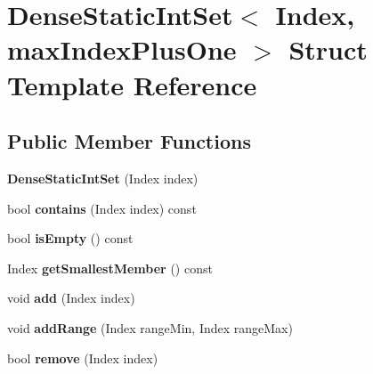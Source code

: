 \hypertarget{struct_dense_static_int_set}{}\section{Dense\+Static\+Int\+Set$<$ Index, max\+Index\+Plus\+One $>$ Struct Template Reference}
\label{struct_dense_static_int_set}
\subsection*{Public Member Functions}
\begin{DoxyCompactItemize}
\item 
\mbox{\label{struct_dense_static_int_set_a066decca43c123618bacd47fc1da8c12}} 
{\bfseries Dense\+Static\+Int\+Set} (Index index)
\item 
\mbox{\label{struct_dense_static_int_set_a20fadddd5d316b82a7c04a50fb3619fc}} 
bool {\bfseries contains} (Index index) const
\item 
\mbox{\label{struct_dense_static_int_set_add9d4f93d3d27d4f662b388e1c797cb2}} 
bool {\bfseries is\+Empty} () const
\item 
\mbox{\label{struct_dense_static_int_set_a9540b1765f0d4b72f1c4ab29496ab741}} 
Index {\bfseries get\+Smallest\+Member} () const
\item 
\mbox{\label{struct_dense_static_int_set_abd86ddd57ca2a9bca54d35959dc4d674}} 
void {\bfseries add} (Index index)
\item 
\mbox{\label{struct_dense_static_int_set_ac98b7fae4e98d5e069d9aeb2bf1924c7}} 
void {\bfseries add\+Range} (Index range\+Min, Index range\+Max)
\item 
\mbox{\label{struct_dense_static_int_set_a0270f1d866496123fb3a4d33d7ccb4e0}} 
bool {\bfseries remove} (Index index)
\end{DoxyCompactItemize}

